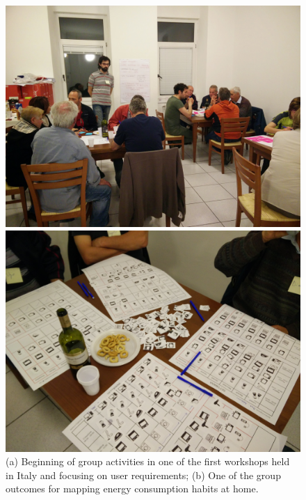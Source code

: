 \begin{figure}
      \begin{center}
        \begin{minipage}[htb]{0.43\linewidth}    
        \includegraphics[width=1\linewidth]{img/Workshop_userreq1.jpg}
        \end{minipage}
 	\hfill 
         \begin{minipage}[htb]{0.55\linewidth}    
	        \includegraphics[width=1\linewidth]{img/Workshop_userreq2.jpg} 
                \end{minipage}
      \end{center}
    \caption{(a) Beginning of group activities in one of the first workshops held in Italy and focusing
    on user requirements; (b) One of the group outcomes for mapping energy consumption habits at home. 
}
\label{fig:workshops}
\end{figure}

